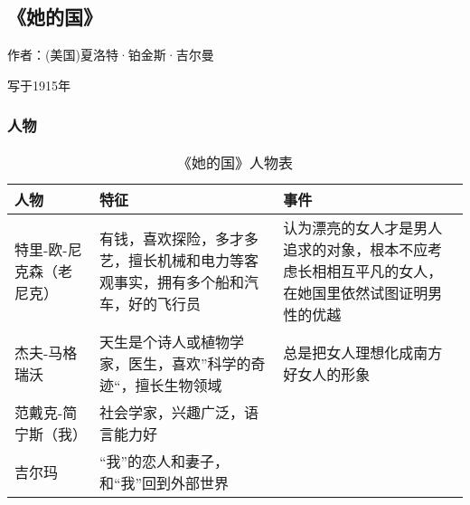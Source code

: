\subsection{《她的国》}

作者：(美国)夏洛特·铂金斯·吉尔曼

写于1915年

\subsubsection{人物}
\begin{table}[htp]
    \centering
    \caption{《她的国》人物表}
    \begin{tabular}{l|p{}|p{}}
人物 & 特征	& 事件 \\
\hline
特里-欧-尼克森（老尼克） &	有钱，喜欢探险，多才多艺，擅长机械和电力等客观事实，拥有多个船和汽车，好的飞行员 & 认为漂亮的女人才是男人追求的对象，根本不应考虑长相相互平凡的女人，在她国里依然试图证明男性的优越 \\
杰夫-马格瑞沃 & 天生是个诗人或植物学家，医生，喜欢”科学的奇迹“，擅长生物领域 & 总是把女人理想化成南方好女人的形象 \\
范戴克-简宁斯（我） &	社会学家，兴趣广泛，语言能力好	 & \\
吉尔玛 & “我”的恋人和妻子，和“我”回到外部世界 & \\
\hline
    \end{tabular}
\end{table}

